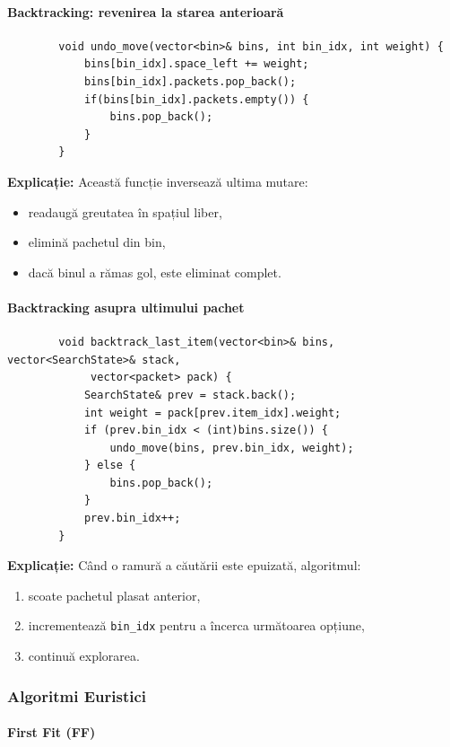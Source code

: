 \documentclass[runningheads]{llncs}
\begin{document}
	\paragraph{\Large Backtracking: revenirea la starea anterioară}

	\begin{verbatim}
		void undo_move(vector<bin>& bins, int bin_idx, int weight) {
			bins[bin_idx].space_left += weight;
			bins[bin_idx].packets.pop_back();
			if(bins[bin_idx].packets.empty()) {
				bins.pop_back();
			}
		}
	\end{verbatim}

	\textbf{Explicație:}
	Această funcție inversează ultima mutare:
	\begin{itemize}
		\item readaugă greutatea în spațiul liber,
		\item elimină pachetul din bin,
		\item dacă binul a rămas gol, este eliminat complet.
	\end{itemize}

	\paragraph{\Large Backtracking asupra ultimului pachet}

	\begin{verbatim}
		void backtrack_last_item(vector<bin>& bins, vector<SearchState>& stack,
			 vector<packet> pack) {
			SearchState& prev = stack.back();
			int weight = pack[prev.item_idx].weight;
			if (prev.bin_idx < (int)bins.size()) {
				undo_move(bins, prev.bin_idx, weight);
			} else {
				bins.pop_back();
			}
			prev.bin_idx++;
		}
	\end{verbatim}

	\textbf{Explicație:}
	Când o ramură a căutării este epuizată, algoritmul:
	\begin{enumerate}
		\item scoate pachetul plasat anterior,
		\item incrementează \texttt{bin\_idx} pentru a încerca următoarea opțiune,
		\item continuă explorarea.
	\end{enumerate}


	\subsubsection{Algoritmi Euristici}

	\paragraph{\Large First Fit (FF)}
\end{document}
